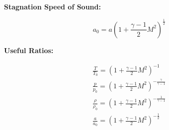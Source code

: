 \textbf{Stagnation Speed of Sound:}

\begin{equation}
	a_0 = a \left( 1 + \frac{\gamma - 1}{2} M^2 \right)^{\frac{1}{2}}
\end{equation}

\textbf{Useful Ratios:}

\begin{gather}
	\frac{T}{T_0} = \left( 1 + \frac{\gamma - 1}{2} M^2 \right)^{-1} \\
	\frac{p}{p_0} = \left( 1 + \frac{\gamma - 1}{2} M^2 \right)^{-\frac{\gamma}{\gamma - 1}} \\
	\frac{\rho}{\rho_0} = \left( 1 + \frac{\gamma - 1}{2} M^2 \right)^{-\frac{1}{\gamma - 1}} \\
	\frac{a}{a_0} = \left( 1 + \frac{\gamma - 1}{2} M^2 \right)^{-\frac{1}{2}}
\end{gather}
